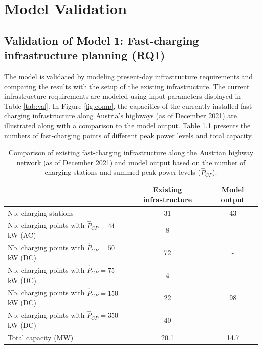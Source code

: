 \chapter{Model Validation}\label{app:validation}

\section{Validation of Model 1: Fast-charging infrastructure planning (RQ1)}\label{app:validation_rq1}

The model is validated by modeling present-day infrastructure requirements and comparing the results with the setup of the existing infrastructure. The current infrastructure requirements are modeled using input parameters displayed in Table \ref{tab:val}. In Figure \ref{fig:comp}, the capacities of the currently installed fast-charging infrastructure along Austria's highways (as of December 2021) are illustrated along with a comparison to the model output. Table \ref{tab:validation} presents the numbers of fast-charging points of different peak power levels and total capacity.

\begin{table}[h]
\centering
\caption{Comparison of existing fast-charging infrastructure along the Austrian highway network (as of December 2021) and model output based on the number of charging stations and summed peak power levels ($\hat{P}_{CP}$).\label{tab:validation}}

\begin{tabularx}{\textwidth}{@{}lcc@{}}
\toprule
                                                  & Existing infrastructure & Model output \\ \midrule
Nb. charging stations                   & 31                      & 43           \\
Nb. charging points with $\hat{P}_{CP} = 44$ kW (AC)& 8 &  -           \\
Nb. charging points with $\hat{P}_{CP} = 50$ kW (DC)&     72                    & -            \\
Nb. charging points with $\hat{P}_{CP} = 75$ kW (DC)&      4                   & -            \\
Nb. charging points with $\hat{P}_{CP} = 150$ kW (DC)&        22                 & 98         \\
Nb. charging points with $\hat{P}_{CP} = 350$ kW (DC) &         40                & -            \\ \midrule
Total capacity (MW) & 20.1 & 14.7\\
\bottomrule
\end{tabularx}

\end{table}

